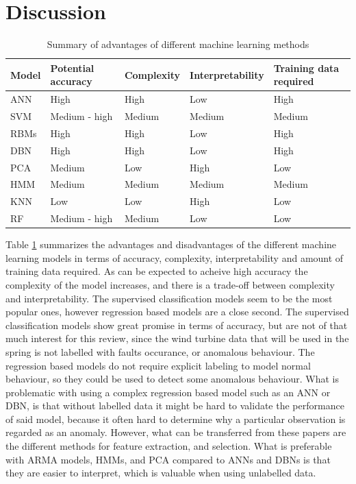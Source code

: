 \section{Discussion}
\begin{table}[h]
    \centering
    \begin{tabular}{p{}p{}p{}p{}p{}}
        \toprule
        Model   & Potential accuracy & Complexity & Interpretability & Training data required \\
        \midrule
        ANN     & High               & High       & Low              & High \\
        SVM     & Medium - high      & Medium     & Medium           & Medium \\
        RBMs    & High               & High       & Low              & High \\
        DBN     & High               & High       & Low              & High \\
        PCA     & Medium             & Low        & High             & Low \\
        HMM     & Medium             & Medium     & Medium           & Medium \\
        KNN     & Low                & Low        & High             & Low \\
        RF      & Medium - high      & Medium     & Low              & Low \\
        \bottomrule
    \end{tabular}
    \caption{Summary of advantages of different machine learning methods}
    \label{tab:ml_wt_sum}
\end{table}

Table \ref{tab:ml_wt_sum} summarizes the advantages and disadvantages of the different machine learning models in terms of accuracy, complexity, interpretability and amount of training data required.
As can be expected to acheive high accuracy the complexity of the model increases, and there is a trade-off between complexity and interpretability. 
The supervised classification models seem to be the most popular ones, however regression based models are a close second. 
The supervised classification models show great promise in terms of accuracy, but are not of that much interest for this review, since the wind turbine data that will be used in the spring is not labelled with faults occurance, or anomalous behaviour. 
The regression based models do not require explicit labeling to model normal behaviour, so they could be used to detect some anomalous behaviour. 
What is problematic with using a complex regression based model such as an ANN or DBN, is that without labelled data it might be hard to validate the performance of said model, because it often hard to determine why a particular observation is regarded as an anomaly. 
However, what can be transferred from these papers are the different methods for feature extraction, and selection. 
What is preferable with ARMA models, HMMs, and PCA compared to ANNs and DBNs is that they are easier to interpret, which is valuable when using unlabelled data. \bigskip

